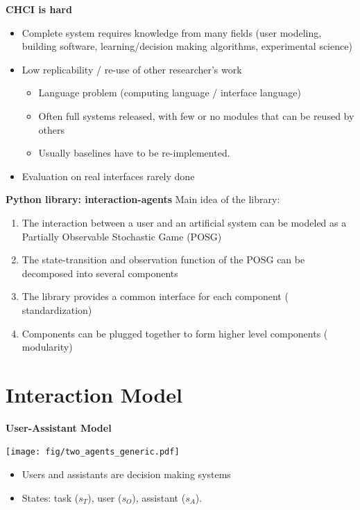 \documentclass[11pt, xcolor = {dvipsnames}]{beamer}
\newcommand{\bmf}[1]{{\usebeamercolor[fg]{title} #1}}
\begin{document}
\begin{frame}{\textbf{CHCI is hard}}
\begin{itemize}
\item Complete system requires knowledge from many fields (user modeling, building software, learning/decision making algorithms, experimental science)
\item Low replicability / re-use of other researcher's work
	\begin{itemize}
		\item Language problem (computing language / interface language)
		\item Often full systems released, with few or no modules that can be reused by others
		\item Usually baselines have to be re-implemented.
	\end{itemize}
\item Evaluation on real interfaces rarely done
\end{itemize}

\end{frame}


\begin{frame}{\textbf{Python library: interaction-agents}}
Main idea of the library:
\begin{enumerate}
\item The interaction between a user and an artificial system can be modeled as a Partially Observable Stochastic Game (POSG)
\item The state-transition and observation function of the POSG can be decomposed into several components
\item The library provides a common interface for each component (\bmf{standardization})
\item Components can be plugged together to form higher level components (\bmf{modularity})
\end{enumerate}

\end{frame}

\section{Interaction Model}


\begin{frame}{\textbf{User-Assistant Model}}
\begin{minipage}{.6\textwidth}
\texttt{[image: fig/two\_agents\_generic.pdf]} 
\end{minipage}
\begin{minipage}{.38\textwidth}
\begin{itemize}
\item Users and assistants are decision making systems
\item States: task ($s_T$), user ($s_O$), assistant ($s_A$).
\end{itemize}
\end{minipage}
\end{frame}
\end{document}
